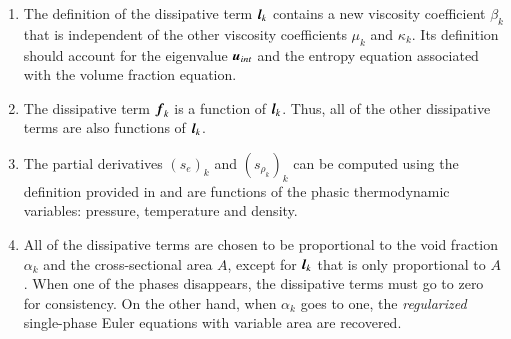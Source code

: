 \documentclass[preprint,10pt]{elsarticle}
\begin{document}
\begin{enumerate}
\item {The definition of the dissipative term $\boldsymbol l_k$ contains a new viscosity
    coefficient $\beta_k$ that is independent of
    the other viscosity coefficients $\mu_k$ and $\kappa_k$. Its definition should
    account for the eigenvalue $\boldsymbol u_{int}$ and  the entropy equation associated with the volume fraction equation.}

\item {The dissipative term $\boldsymbol f_k$ is a function of $\boldsymbol l_k$. Thus, all of the other
    dissipative terms are also functions of $\boldsymbol l_k$.}

\item {The partial derivatives $(s_e)_k$ and $(s_{\rho_k})_k$ can be computed using the
    definition provided in  and are functions of the phasic thermodynamic
    variables: pressure, temperature and density.}

\item {All of the dissipative terms are chosen to be proportional to the void
    fraction $\alpha_k$ and the cross-sectional area $A$, except for $\boldsymbol l_k$ that is only proportional to $A$. 
		When one of the phases disappears, the dissipative terms
    must go to zero for consistency. On the other hand, when $\alpha_k$ goes to one,
    the \emph{regularized} single-phase Euler equations with variable area are recovered. %
		}    


\end{enumerate}
\end{document}
